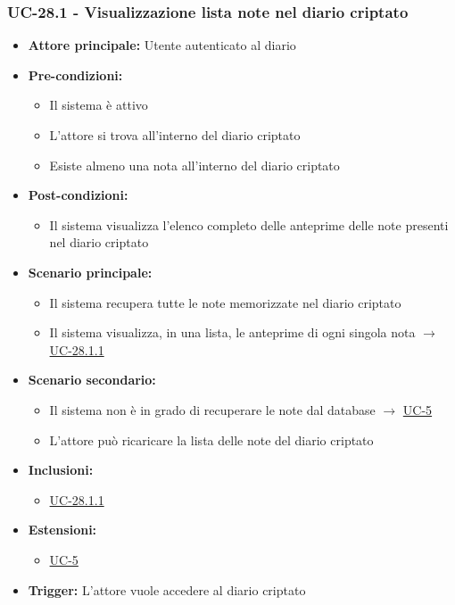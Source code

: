 \documentclass[a4paper,12pt]{article}
\begin{document}
\subsubsection{UC-28.1 - Visualizzazione lista note nel diario criptato} \label{subsec:UC-28.1}
\begin{itemize}
    \item \textbf{Attore principale:} Utente autenticato al diario
    \item \textbf{Pre-condizioni:}
    \begin{itemize}
        \item Il sistema è attivo
        \item L'attore si trova all'interno del diario criptato
        \item Esiste almeno una nota all'interno del diario criptato
    \end{itemize}
    \item \textbf{Post-condizioni:} 
    \begin{itemize}
        \item Il sistema visualizza l'elenco completo delle anteprime delle note presenti nel diario criptato
    \end{itemize}
    \item \textbf{Scenario principale:} 
    \begin{itemize}
        \item Il sistema recupera tutte le note memorizzate nel diario criptato
        \item Il sistema visualizza, in una lista, le anteprime di ogni singola nota $\rightarrow$ \hyperref[subsec:UC-28.1.1]{UC-28.1.1}
    \end{itemize}
    \item \textbf{Scenario secondario:} 
    \begin{itemize}
        \item Il sistema non è in grado di recuperare le note dal database $\rightarrow$ \hyperref[sec:UC-5]{UC-5}
        \item L'attore può ricaricare la lista delle note del diario criptato
    \end{itemize}
    \item \textbf{Inclusioni:}
    \begin{itemize}
        \item \hyperref[subsec:UC-28.1.1]{UC-28.1.1}
    \end{itemize}
    \item \textbf{Estensioni:}
    \begin{itemize}
        \item \hyperref[sec:UC-5]{UC-5}
    \end{itemize}
    \item \textbf{Trigger:} L'attore vuole accedere al diario criptato
\end{itemize}
\end{document}
